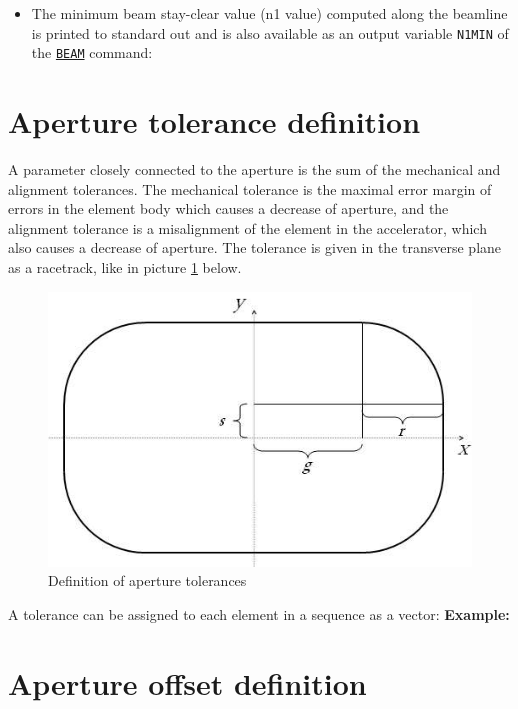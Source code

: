 \begin{itemize}
   \item The minimum beam stay-clear value (n1 value) computed along the 
     beamline is printed to standard out and is also available as an output 
     variable {\tt N1MIN} of the \hyperref[sec:beam]{\tt BEAM} command: 

\end{itemize}

\section{Aperture tolerance definition}
\label{sec:apertol}
A parameter closely connected to the aperture is the sum of the
mechanical and alignment tolerances. The mechanical tolerance is 
the maximal error margin of errors in the element body which 
causes a decrease of aperture, and the alignment tolerance is a 
misalignment of the element in the accelerator, which also causes a 
decrease of aperture. The tolerance is given in the transverse plane 
as a racetrack, like in picture \ref{fig:aperture-tol} below. 

\begin{figure}[htb]
  \begin{center}
    \includegraphics[width=250bp]{jpg/tolerance.jpg}
    \caption{Definition of aperture tolerances}
    \label{fig:aperture-tol}
  \end{center}
\end{figure}

A tolerance can be assigned to each element in a \madx sequence as a vector: 
{\bf Example:}

\section{Aperture offset definition}
\label{sec:aperoffset}

